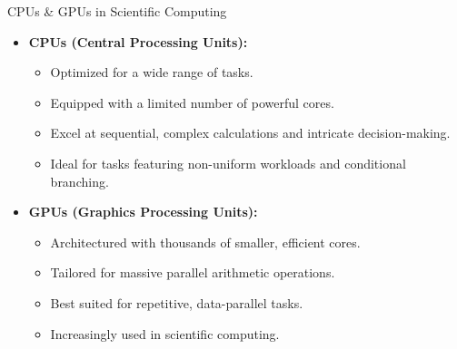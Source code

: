 \documentclass[aspectratio=169, 11pt]{beamer}
\begin{document}
\begin{frame}{CPUs \& GPUs in Scientific Computing}
  \begin{itemize}
    \item \textbf{CPUs (Central Processing Units):}
      \begin{itemize}
        \item Optimized for a wide range of tasks.
        \item Equipped with a limited number of powerful cores.
        \item Excel at sequential, complex calculations and intricate decision-making.
        \item Ideal for tasks featuring non-uniform workloads and conditional branching.
      \end{itemize}
      \vfill
    \item \textbf{GPUs (Graphics Processing Units):}
      \begin{itemize}
        \item Architectured with thousands of smaller, efficient cores.
        \item Tailored for massive parallel arithmetic operations.
        \item Best suited for repetitive, data-parallel tasks.
        \item Increasingly used in scientific computing.
      \end{itemize}
  \end{itemize}
\end{frame}




\end{document}
